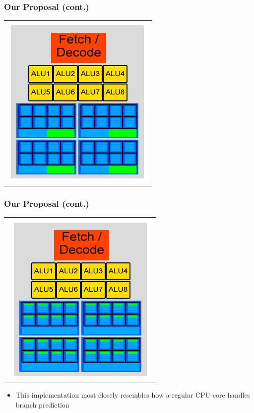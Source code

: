 \documentclass{beamer}
\begin{document}
\begin{frame}
	\frametitle{Our Proposal (cont.)}
	\begin{tabular}{c}
		\includegraphics[width=.5\textwidth]{Our-GPU---per-context-group-predictor.jpg}
	\end{tabular}
\end{frame}

\begin{frame}
	\frametitle{Our Proposal (cont.)}
	\begin{tabular}{c}
		\includegraphics[width=.5\textwidth]{Our-GPU---per-element-predictor.jpg}
	\end{tabular}
	\begin{itemize}
		\item This implementation most closely resembles how a regular CPU core handles branch prediction
	\end{itemize}
\end{frame}
\end{document}

